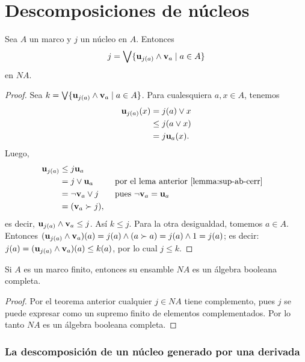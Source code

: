 \section{Descomposiciones de núcleos}

\begin{thm}
  Sea $A$ un marco y $j$ un núcleo en $A$.
  Entonces
  \[
    j = \bigvee\{ \mathbf u_{j(a)}\wedge\mathbf v_{a} \mid a\in A\}
  \]
  en $NA$.
\end{thm}
\begin{proof}
Sea $k=\bigvee\{\mathbf u_{j(a)}\wedge \mathbf v_{a}\mid a\in A\}$.
Para cualesquiera $a,x\in A$, tenemos
\begin{align*}
  \mathbf u_{j(a)}(x)
  &= j(a)\vee x \\
  &\leq j(a \vee x) \\
  &= j\mathbf u_{a}(x).
\end{align*}
Luego, 
\begin{align*}
  \mathbf u_{j(a)}
  &\leq j\mathbf u_{a} \\
  &= j\vee \mathbf u_{a} && \text{ por el lema anterior
  \ref{lemma:sup-ab-cerr}} \\
  &= \neg \mathbf v_{a} \vee j
    && \text{ pues } \neg\mathbf v_{a} = \mathbf u_{a} \\
  &= (\mathbf v_{a} \succ j),
\end{align*}
es decir, $\mathbf u_{j(a)} \wedge \mathbf v_{a} \leq j$.
Así $k\leq j$.
Para la otra desigualdad, tomemos $a\in A$.
Entonces $(\mathbf u_{j(a)}\wedge \mathbf v_{a})(a)=j(a)\wedge (a\succ a)=j(a)\wedge 1=j(a)$;
es decir: $j(a)=(\mathbf u_{j(a)}\wedge \mathbf v_{a})(a)\leq k(a)$,
por lo cual $j\leq k$.
\end{proof}

\begin{cor}
  Si $A$ es un marco finito, entonces su ensamble $NA$ es un
  álgebra booleana completa.
\end{cor}
\begin{proof}
Por el teorema anterior cualquier $j\in NA$ tiene complemento, pues $j$ se puede expresar como un supremo finito de elementos complementados. Por lo tanto $NA$ es un álgebra booleana completa.
\end{proof}


\subsubsection{La descomposición de un núcleo generado por una derivada}

